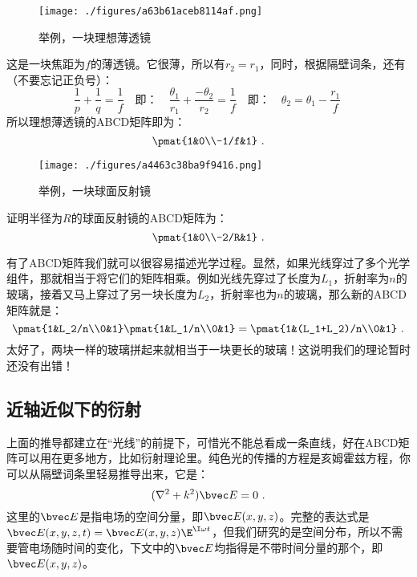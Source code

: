 \begin{example}{}\label{ABCD_Sample_2}
\begin{figure}[ht]
\centering
\texttt{[image: ./figures/a63b61aceb8114af.png]}
\caption{举例，一块理想薄透镜} \label{fig_GBeam_3}
\end{figure}
这是一块焦距为$f$的薄透镜。它很薄，所以有$r_2=r_1$，同时，根据隔壁词条，还有（不要忘记正负号）：
\begin{equation}
\frac{1}{p}+\frac{1}{q}=\frac{1}{f}\quad\text{即：}\quad\frac{\theta_1}{r_1}+\frac{-\theta_2}{r_2}=\frac{1}{f}\quad\text{即：}\quad\theta_2=\theta_1-\frac{r_1}{f}~
\end{equation}
所以理想薄透镜的ABCD矩阵即为：
\begin{equation}
\pmat{1&0\\-1/f&1}~.
\end{equation}
\end{example}

\begin{exercise}{}\label{ABCD_Sample_3}
\begin{figure}[ht]
\centering
\texttt{[image: ./figures/a4463c38ba9f9416.png]}
\caption{举例，一块球面反射镜} \label{fig_GBeam_4}
\end{figure}
证明半径为$R$的球面反射镜的ABCD矩阵为：
\begin{equation}
\pmat{1&0\\-2/R&1}~.
\end{equation}
\end{exercise}

有了ABCD矩阵我们就可以很容易描述光学过程。显然，如果光线穿过了多个光学组件，那就相当于将它们的矩阵相乘。例如光线先穿过了长度为$L_1$，折射率为$n$的玻璃，接着又马上穿过了另一块长度为$L_2$，折射率也为$n$的玻璃，那么新的ABCD矩阵就是：
\begin{equation}
\pmat{1&L_2/n\\0&1}\pmat{1&L_1/n\\0&1}=\pmat{1&(L_1+L_2)/n\\0&1}~.
\end{equation}
太好了，两块一样的玻璃拼起来就相当于一块更长的玻璃！这说明我们的理论暂时还没有出错！

\subsection{近轴近似下的衍射}
上面的推导都建立在“光线”的前提下，可惜光不能总看成一条直线，好在ABCD矩阵可以用在更多地方，比如衍射理论里。纯色光的传播的方程是亥姆霍兹方程，你可以从隔壁词条里轻易推导出来，它是：
\begin{equation}\label{eq_HHeq}
(\nabla^2+k^2)\bvec E=0~.
\end{equation}
这里的$\bvec E$是指电场的空间分量，即$\bvec E(x,y,z)$。完整的表达式是$\bvec E(x,y,z,t)=\bvec E(x,y,z)\E^{\I \omega t}$，但我们研究的是空间分布，所以不需要管电场随时间的变化，下文中的$\bvec E$均指得是不带时间分量的那个，即$\bvec E(x,y,z)$。

